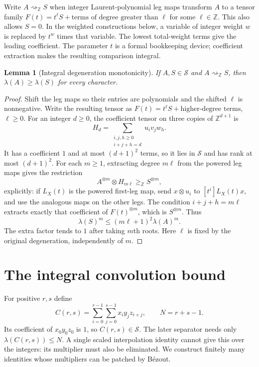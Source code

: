 \documentclass[11pt]{article}
\newtheorem{lemma}[theorem]{Lemma}
\theoremstyle{remark}
\newcommand{\Z}{\mathbb Z}
\newcommand{\res}{\mathrel{\geq_{\Z}}}
\newcommand{\degto}{\mathrel{\rightsquigarrow_{\Z}}}
\begin{document}
Write $A\degto S$ when integer Laurent-polynomial leg maps transform
$A$ to a tensor family $F(t)=t^\ell S+\text{terms of degree greater than }\ell$
for some $\ell\in\Z$. This also allows $S=0$.
In the weighted constructions below, a variable of integer weight $w$
is replaced by $t^w$ times that variable. The lowest total-weight terms
give the leading coefficient. The parameter $t$ is a formal bookkeeping
device; coefficient extraction makes the resulting comparison integral.

\begin{lemma}[Integral degeneration monotonicity]\label{lem:deg}
If $A,S\in\mathcal S$ and $A\degto S$, then
$\lambda(A)\geq\lambda(S)$ for every character.
\end{lemma}
\begin{proof}
Shift the leg maps so their entries are polynomials and the shifted
$\ell$ is nonnegative. Write the resulting tensor as
$F(t)=t^\ell S+\text{higher-degree terms}$, $\ell\geq0$.
For an integer $d\geq0$, the coefficient tensor on three copies of
$\Z^{d+1}$ is
\[
 H_d=\sum_{\substack{i,j,h\geq0\\i+j+h=d}}
            u_i v_j w_h.
\]
It has a coefficient $1$ and at most $(d+1)^2$ terms, so it lies in
$\mathcal S$ and has rank at most $(d+1)^2$.
For each $m\geq1$, extracting degree $m\ell$ from the powered leg maps
gives the restriction
\[
 A^{\otimes m}\otimes H_{m\ell}\res S^{\otimes m},
\]
explicitly: if $L_X(t)$ is the powered first-leg map, send
$x\otimes u_i$ to $[t^i]L_X(t)x$, and use the analogous maps on the
other legs. The condition $i+j+h=m\ell$ extracts exactly that
coefficient of $F(t)^{\otimes m}$, which is $S^{\otimes m}$.
Thus
\[
 \lambda(S)^m\leq(m\ell+1)^2\lambda(A)^m.
\]
The extra factor tends to $1$ after taking $m$th roots. Here $\ell$
is fixed by the original degeneration, independently of $m$.
\end{proof}

\section{The integral convolution bound}

For positive $r,s$ define
\[
 C(r,s)=\sum_{i=0}^{r-1}\sum_{j=0}^{s-1}x_i y_j z_{i+j},
 \qquad N=r+s-1.
\]
Its coefficient of $x_0y_0z_0$ is $1$, so $C(r,s)\in\mathcal S$.
The later separator needs only $\lambda(C(r,s))\leq N$. A single
scaled interpolation identity cannot give this over the integers:
its multiplier must also be eliminated. We construct finitely many
identities whose multipliers can be patched by B\'ezout.
\end{document}
